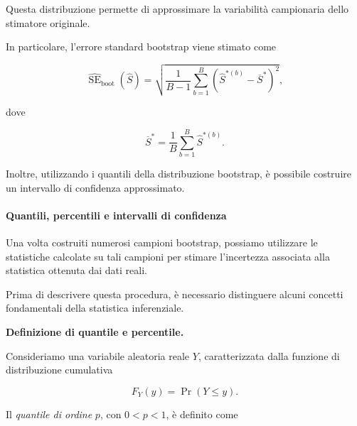 Questa distribuzione permette di approssimare la variabilità campionaria
dello stimatore originale.

In particolare, l'errore standard bootstrap viene stimato come

\[
\widehat{\operatorname{SE}}_{\mathrm{boot}}(\widehat{S})
=
\sqrt{
\frac{1}{B-1}
\sum_{b=1}^{B}
\left(
\widehat{S}^{*(b)}
-
\overline{S}^{*}
\right)^2
},
\]

dove

\[
\overline{S}^{*}
=
\frac{1}{B}
\sum_{b=1}^{B}\widehat{S}^{*(b)}.
\]

Inoltre, utilizzando i quantili della distribuzione bootstrap, è possibile
costruire un intervallo di confidenza approssimato.





\paragraph{Quantili, percentili e intervalli di confidenza}

Una volta costruiti numerosi campioni bootstrap, possiamo utilizzare
le statistiche calcolate su tali campioni per stimare l'incertezza
associata alla statistica ottenuta dai dati reali.

Prima di descrivere questa procedura, è necessario distinguere
alcuni concetti fondamentali della statistica inferenziale.

\medskip

\noindent
\textbf{Definizione di quantile e percentile.}

Consideriamo una variabile aleatoria reale $Y$,
caratterizzata dalla funzione di distribuzione cumulativa

\[
F_Y(y)=\Pr(Y\leq y).
\]

Il \textit{quantile di ordine} $p$, con $0<p<1$,
è definito come

